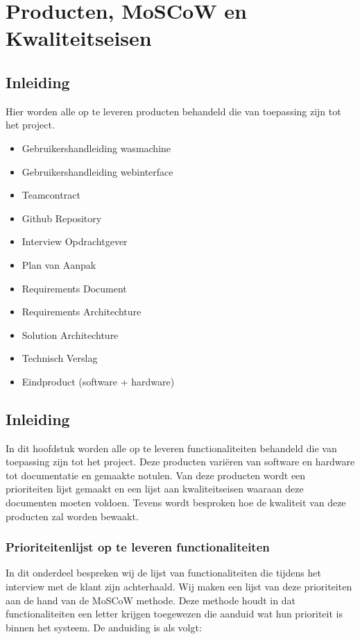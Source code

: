 \chapter{Producten, MoSCoW en Kwaliteitseisen}
\section{Inleiding}
Hier worden alle op te leveren producten behandeld die van toepassing zijn tot het project.
\begin{itemize}
	\item Gebruikershandleiding wasmachine
	\item Gebruikershandleiding webinterface
	\item Teamcontract
	\item Github Repository
	\item Interview Opdrachtgever
	\item Plan van Aanpak
	\item Requirements Document
	\item Requirements Architechture
	\item Solution Architechture
	\item Technisch Verslag
	\item Eindproduct (software + hardware)
\end{itemize}

\section{Inleiding}
In dit hoofdstuk worden alle op te leveren functionaliteiten behandeld die van toepassing zijn tot het project.
Deze producten variëren van software en hardware tot documentatie en gemaakte notulen.
Van deze producten wordt een prioriteiten lijst gemaakt en een lijst aan kwaliteitseisen waaraan deze documenten moeten voldoen.
Tevens wordt besproken hoe de kwaliteit van deze producten zal worden bewaakt.

\subsection{Prioriteitenlijst op te leveren functionaliteiten}
In dit onderdeel bespreken wij de lijst van functionaliteiten die tijdens het interview met de klant zijn achterhaald.
Wij maken een lijst van deze prioriteiten aan de hand van de MoSCoW methode. Deze methode houdt in dat functionaliteiten een letter krijgen toegewezen die aanduid wat hun prioriteit is binnen het systeem.
De anduiding is als volgt: 


